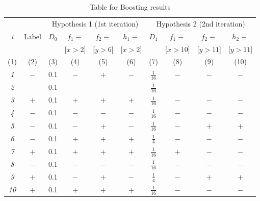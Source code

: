 \documentclass[11pt]{article}
\begin{document}
    \begin{table}[!t]
      {\centering
        \begin{tabular}{|c|c||c|c|c|c||c|c|c|c|}

          \hline
          & & \multicolumn{4}{c||}{Hypothesis 1 (1st iteration)}
	  & \multicolumn{4}{c|}{Hypothesis 2 (2nd iteration)} \\
          \cline{3-10}
          {\em i} & Label & $D_0$ & $f_1 \equiv $ & $f_2 \equiv $ & $h_1\equiv$ & $D_1$ &  $f_1 \equiv $ & $f_2 \equiv $ & $h_2 \equiv $ \\
          & & & [$x > 2$] & [$y > 6$] & [$x > 2$] & & [$x > 10$] & [$y > 11$] & [$y > 11$] \\

          \tiny{(1)} & \tiny{(2)} & \tiny{(3)} & \tiny{(4)} &  \tiny{(5)} & \tiny{(6)} & \tiny{(7)} & \tiny{(8)} & \tiny{(9)} & \tiny{(10)}\\
          \hline \hline
          {\em 1} & $-$ & 0.1 & $-$ & $+$ & $-$ & $\frac{1}{16}$ & $-$ & $-$ & $-$ \\
          \hline
          {\em 2} & $-$ & 0.1 & $-$ & $-$ & $-$ & $\frac{1}{16}$ & $-$ & $-$ & $-$ \\
          \hline
          {\em 3} & $+$ & 0.1 & $+$ & $+$ & $+$ & $\frac{1}{16}$ & $-$ & $-$ & $-$ \\
          \hline
          {\em 4} & $-$ & 0.1 & $-$ & $-$ & $-$ & $\frac{1}{16}$ & $-$ & $-$ & $-$ \\
          \hline
          {\em 5} & $-$ & 0.1 & $-$ & $+$ & $-$ & $\frac{1}{16}$ & $-$ & $+$ & $+$ \\
          \hline
          {\em 6} & $-$ & 0.1 & $+$ & $+$ & $+$ & $\frac{1}{4}$ & $-$ & $-$ & $-$ \\
          \hline
          {\em 7} & $+$ & 0.1 & $+$ & $+$ & $+$ & $\frac{1}{16}$ & $+$ & $-$ & $-$ \\
          \hline
          {\em 8} & $-$ & 0.1 & $-$ & $-$ & $-$ & $\frac{1}{16}$ & $-$ & $-$ & $-$ \\
          \hline
          {\em 9} & $+$ & 0.1 & $-$ & $+$ & $-$ & $\frac{1}{4}$ & $-$ & $+$ & $+$ \\
          \hline
          {\em 10} & $+$ & 0.1 & $+$ & $+$ & $+$ & $\frac{1}{16}$ & $-$ & $-$ & $-$ \\
          \hline
        \end{tabular}
        \caption{Table for Boosting results}\label{table:ltu}}
    \end{table}
\end{document}
